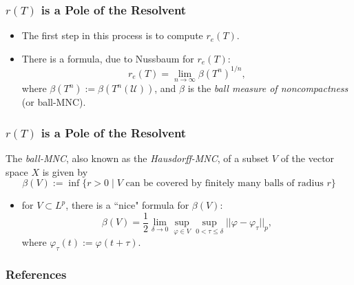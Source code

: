 \documentclass{beamer}
\newcommand{\dd}{{\delta}}
\begin{document}
\begin{frame}
	\frametitle{$r(T)$ is a Pole of the Resolvent}
	\begin{itemize}
		\item The first step in this process is to compute $r_e(T)$.
		\pause
		\item There is a formula, due to Nussbaum \cite{Nussbaum1970} for $r_e(T)$:
		\[r_e(T) = \lim_{n \to \infty} \beta(T^n)^{1/n},\]
		\pause
		where $\beta(T^n) := \beta(T^n(\mathscr{U}))$, and $\beta$ is the \emph{ball measure of noncompactness} (or ball-MNC).
	\end{itemize}
\end{frame}

\begin{frame}
	\frametitle{$r(T)$ is a Pole of the Resolvent}
	\begin{definition}
		The \emph{ball-MNC}, also known as the \emph{Hausdorff-MNC}, of a subset $V$ of the vector space $X$ is given by
		\[\beta(V) := \inf\{r > 0 \mid V \text{ can be covered by finitely many balls of radius } r\}\]
	\end{definition}
	\pause
	\begin{itemize}
		\item for $V \subset L^p$, there is a ``nice" formula for $\beta(V)$:
			\[\beta(V) = \frac 12 \lim_{\dd \to 0} \sup_{\varphi \in V} \sup_{0 < \tau \leq \dd} ||\varphi - \varphi_\tau||_p,\]
			where $\varphi_\tau(t) := \varphi(t+\tau)$.
	\end{itemize}
\end{frame}

\begin{frame}[allowframebreaks]
	\frametitle{References}
		\printbibliography
\end{frame}

\end{document}
